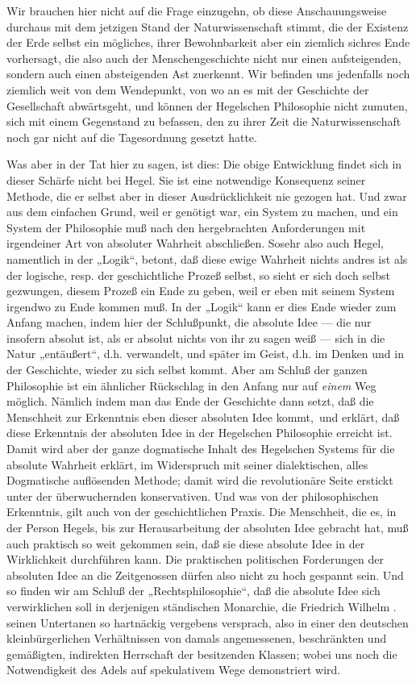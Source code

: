 Wir brauchen hier nicht auf die Frage einzugehn, ob diese
Anschauungsweise durchaus mit dem jetzigen Stand der Naturwissenschaft
stimmt, die der Existenz der Erde selbst ein mögliches, ihrer
Bewohnbarkeit aber ein ziemlich sichres Ende vorhersagt, die also auch
der Menschengeschichte nicht nur einen aufsteigenden, sondern auch einen
absteigenden Ast zuerkennt. Wir befinden uns jedenfalls noch ziemlich
weit von dem Wendepunkt, von wo an es mit der Geschichte der
Gesellschaft abwärtsgeht, und können der Hegelschen Philosophie nicht
zumuten, sich mit einem Gegenstand zu befassen, den zu ihrer Zeit die
Naturwissenschaft noch gar nicht auf die Tagesordnung gesetzt hatte.

Was aber in der Tat hier zu sagen, ist dies: Die obige
Entwicklung findet sich in dieser Schärfe nicht bei Hegel. Sie ist eine
notwendige Konsequenz seiner Methode, die er selbst aber in dieser
Ausdrücklichkeit nie gezogen hat. Und zwar aus dem einfachen Grund, weil
er genötigt war, ein System zu machen, und ein System der Philosophie
muß nach den hergebrachten Anforderungen mit irgendeiner Art von
absoluter Wahrheit abschließen. Sosehr also auch Hegel, namentlich in
der „Logik``, betont, daß diese ewige Wahrheit nichts andres ist als der
logische, resp. der geschichtliche Prozeß selbst, so sieht er sich doch
selbst gezwungen, diesem Prozeß ein Ende zu geben, weil er eben mit
seinem System irgendwo zu Ende kommen muß. In der „Logik`` kann er dies
Ende wieder zum Anfang machen, indem hier der Schlußpunkt, die absolute
Idee --- die nur insofern absolut ist, als er absolut nichts von ihr zu
sagen weiß --- sich in die Natur „entäußert``, d.h. verwandelt, und später
im Geist, d.h. im Denken und in der Geschichte, wieder zu sich selbst
kommt. Aber am Schluß der ganzen Philosophie ist ein ähnlicher
Rückschlag in den Anfang nur auf \emph{einem} Weg möglich. Nämlich indem
man das Ende der Geschichte dann setzt, daß die Menschheit zur
Erkenntnis eben dieser absoluten Idee kommt, \textbar{}\,und erklärt, daß diese
Erkenntnis der absoluten Idee in der Hegelschen Philosophie erreicht ist.\,\textbar{} Damit wird aber der ganze dogmatische Inhalt des Hegelschen Systems
für die absolute Wahrheit erklärt, im Widerspruch mit seiner
dialektischen, alles Dogmatische auflösenden Methode; damit wird die
revolutionäre Seite erstickt unter der überwuchernden konservativen. Und
was von der philosophischen Erkenntnis, gilt auch von der
geschichtlichen Praxis. Die Menschheit, die es, in der Person Hegels,
bis zur Herausarbeitung der absoluten Idee gebracht hat, muß auch
praktisch so weit gekommen sein, daß sie diese absolute Idee in der
Wirklichkeit durchführen kann. Die praktischen politischen Forderungen
der absoluten Idee an die Zeitgenossen dürfen also nicht zu hoch
gespannt sein. Und so finden wir am Schluß der „Rechtsphilosophie``, daß
die absolute Idee sich verwirklichen soll in derjenigen ständischen
Monarchie, die Friedrich Wilhelm . seinen Untertanen so hartnäckig
vergebens versprach, also in einer den deutschen kleinbürgerlichen
Verhältnissen von damals angemessenen, beschränkten und gemäßigten,
indirekten Herrschaft der besitzenden Klassen; wobei uns noch die
Notwendigkeit des Adels auf spekulativem Wege demonstriert wird.


